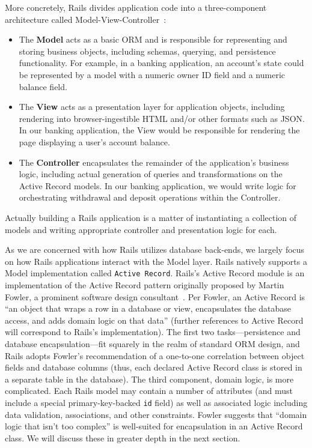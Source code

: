 More concretely, Rails divides application code into a three-component architecture called Model-View-Controller~\cite{gangoffour,mvc}:

\begin{itemize}
\item The \textbf{Model} acts as a basic ORM and is responsible for
  representing and storing business objects, including schemas,
  querying, and persistence functionality. For example, in a banking
  application, an account's state could be represented by a model with
  a numeric owner ID field and a numeric balance field.

\item The \textbf{View} acts as a presentation layer for application objects, including rendering into browser-ingestible HTML and/or other formats such as JSON. In our banking application, the View would be responsible for rendering the page displaying a user's account balance.

\item The \textbf{Controller} encapsulates the remainder of the application's business logic, including actual generation of queries and transformations on the Active Record models. In our banking application, we would write logic for orchestrating withdrawal and deposit operations within the Controller.
\end{itemize}

Actually building a Rails application is a matter of instantiating a collection of models and writing appropriate controller and presentation logic for each.

As we are concerned with how Rails utilizes database back-ends, we largely focus on how Rails applications interact with the Model layer. Rails natively supports a Model implementation called \texttt{Active Record}. Rails's Active Record module is an implementation of the Active Record pattern originally proposed by Martin Fowler, a prominent software design consultant~\cite{fowler-book}. Per Fowler, an Active Record is ``an object that wraps a row in a database or view, encapsulates the database access, and adds domain logic on that data'' (further references to Active Record will correspond to Rails's implementation). The first two tasks---persistence and database encapsulation---fit squarely in the realm of standard ORM design, and Rails adopts Fowler's recommendation of a one-to-one correlation between object fields and database columns (thus, each declared Active Record class is stored in a separate table in the database). The third component, domain logic, is more complicated. Each Rails model may contain a number of attributes (and must include a special primary-key-backed \texttt{id} field) as well as associated logic including data validation, associations, and other constraints. Fowler suggests that ``domain logic that isn't too complex'' is well-suited for encapsulation in an Active Record class. We will discuss these in greater depth in the next section.

